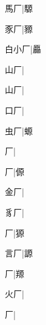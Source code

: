 \begin{multicols}{2}
{{\cjk{}{\cnsym{}　}馬厂}|{\cjk{}騵}\par
{\cjk{}{\cnsym{}　}豕厂}|{\cjk{}豲}\par
{\cjk{}白小厂}|{\cjk{}厵}\par
{\cjk{}{\cnsym{}　}山厂}|{}\par
{\cjk{}{\cnsym{}　}山厂}|{}\par
{\cjk{}{\cnsym{}　}口厂}|{}\par
{\cjk{}{\cnsym{}　}虫厂}|{\cjk{}螈}\par
{厂}|{}\par
{厂}|{\cjk{}傆}\par
{\cjk{}{\cnsym{}　}金厂}|{}\par
{\cjk{}{\cnsym{}　}豸厂}|{}\par
{厂}|{\cjk{}獂}\par
{\cjk{}{\cnsym{}　}言厂}|{\cjk{}謜}\par
{厂}|{\cjk{}羱}\par
{\cjk{}{\cnsym{}　}火厂}|{}\par
{厂}|{}\par
}
\end{multicols}
